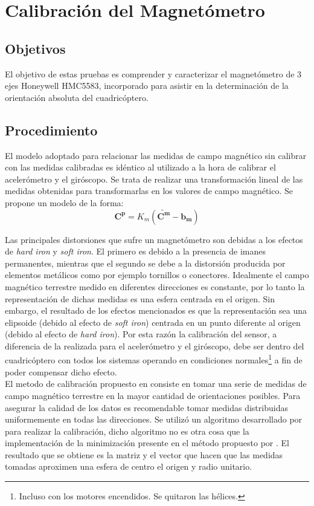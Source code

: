\documentclass[main]{subfiles}
\begin{document}
\chapter{Calibraci\'on del Magnetómetro}
\label{chap:magnetometro}

\section{Objetivos}

El objetivo de estas pruebas es comprender y caracterizar el magnetómetro de 3 ejes Honeywell HMC5583, incorporado para asistir en la determinación de la orientación absoluta del cuadricóptero.

\section{Procedimiento}
\label{sec:procedimiento}

El modelo adoptado para relacionar las medidas de campo magnético sin calibrar con las medidas calibradas es idéntico al utilizado a la hora de calibrar el acelerómetro y el giróscopo. Se trata de realizar una transformación lineal de las medidas obtenidas para transformarlas en los valores de campo magnético. Se propone un modelo de la forma:
$$
\mathbf{C^p} =K_m (\mathbf{\tilde{C^m}} -  \mathbf{b_m})
$$

Las principales distorsiones que sufre un magnet\'ometro son debidas a los efectos de \emph{hard iron} y \emph{soft iron}. El primero es debido a la presencia de imanes permanentes, mientras que el segundo se debe a la distorsi\'on producida por elementos met\'alicos como por ejemplo tornillos o conectores. Idealmente el campo magn\'etico terrestre medido en diferentes direcciones es constante, por lo tanto la representaci\'on de dichas medidas es una esfera centrada en el origen. Sin embargo, el resultado de los efectos mencionados es que la representaci\'on sea una elipsoide (debido al efecto de \emph{soft iron}) centrada en un punto diferente al origen (debido al efecto de \emph{hard iron}). Por esta raz\'on la calibraci\'on del sensor, a diferencia de la realizada para el aceler\'ometro y el gir\'oscopo, debe ser dentro del cuadric\'optero con todos los sistemas operando en condiciones normales\footnote{Incluso con los motores encendidos. Se quitaron las h\'elices.} a fin de poder compensar dicho efecto.\\


El metodo de calibraci\'on propuesto en \cite{bib:bola} consiste en tomar una serie de medidas de campo magnético terrestre en la mayor cantidad de  orientaciones posibles. Para asegurar la calidad de los datos es recomendable tomar medidas distribuidas uniformemente en todas las direcciones. Se utilizó un algoritmo desarrollado por \cite{bib:alain} para realizar la calibración, dicho algoritmo no es otra cosa que la implementación de la minimización presente en el método propuesto por \cite{bib:bola}. El resultado que se obtiene es la matriz y el vector que hacen que las medidas tomadas aproximen una esfera de centro el origen y radio unitario.\\
\end{document}
